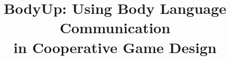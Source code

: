 \documentclass{sig-alternate}
\begin{document}
\title{BodyUp: Using Body Language Communication\\ in Cooperative Game Design}

%

\maketitle


\begin{abstract}

\end{abstract}
\end{document}
